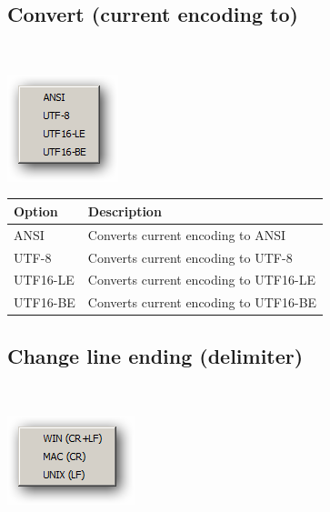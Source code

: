 \hypertarget{menu_encoding_convert}{}
\subsection{Convert (current encoding to)}\\

\includegraphics[scale=0.50]{./res/menu_encoding_convert.png}\\

\begin{scriptsize}\begin{tabularx}{\textwidth}{>{\hsize=0.3\hsize}X>{\hsize=0.7\hsize}X}\\
    \hline
    \textbf{Option} & \textbf{Description} \\
    \hline
    ANSI & Converts current encoding to ANSI \\
    UTF-8 & Converts current encoding to UTF-8 \\
    UTF16-LE & Converts current encoding to UTF16-LE \\
    UTF16-BE & Converts current encoding to UTF16-BE \\
    \hline
  \end{tabularx}\end{scriptsize}

\hypertarget{menu_encoding_delimiter}{}
\subsection{Change line ending (delimiter)}\\

\includegraphics[scale=0.50]{./res/menu_encoding_delimiter.png}\\

